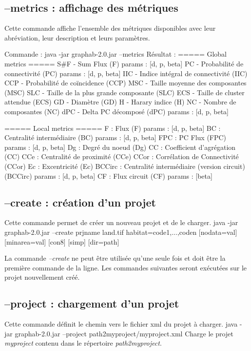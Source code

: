 \documentclass[a4paper,10pt]{report}
\newenvironment{cmd}
{\quote\Verbatim}
{\endVerbatim\endquote}
\begin{document}
\subsection{--metrics : affichage des métriques}
Cette commande affiche l'ensemble des métriques disponibles avec leur abréviation, leur description et leurs paramètres.

Commande :
\begin{cmd}
java -jar graphab-2.0.jar --metrics
\end{cmd}
Résultat :
\begin{cmd}
===== Global metrics =====
S#F - Sum Flux (F)
	params : [d, p, beta]
PC - Probabilité de connectivité (PC)
	params : [d, p, beta]
IIC - Indice intégral de connectivité (IIC)
CCP - Probabilité de coïncidence (CCP)
MSC - Taille moyenne des composantes (MSC)
SLC - Taille de la plus grande composante (SLC)
ECS - Taille de cluster attendue (ECS)
GD - Diamètre (GD)
H - Harary indice (H)
NC - Nombre de composantes (NC)
dPC - Delta PC décomposé (dPC)
	params : [d, p, beta]

===== Local metrics =====
F : Flux (F)
	params : [d, p, beta]
BC : Centralité intermédiaire (BC)
	params : [d, p, beta]
FPC : PC Flux (FPC)
	params : [d, p, beta]
Dg : Degré du noeud (Dg)
CC : Coefficient d'agrégation (CC)
CCe : Centralité de proximité (CCe)
CCor : Corrélation de Connectivité (CCor)
Ec : Excentricité (Ec)
BCCirc : Centralité intermédiaire (version circuit) (BCCirc)
	params : [d, p, beta]
CF : Flux circuit (CF)
	params : [beta]

\end{cmd}

\subsection{--create : création d'un projet}
Cette commande permet de créer un nouveau projet et de le charger.
\begin{cmd}
java -jar graphab-2.0.jar --create prjname land.tif habitat=code1,...,coden [nodata=val]
	[minarea=val] [con8] [simp] [dir=path]
\end{cmd}

La commande \textit{--create} ne peut être utilisée qu'une seule fois et doit être la première commande de la ligne.
Les commandes suivantes seront exécutées sur le projet nouvellement créé.

\subsection{--project : chargement d'un projet}
Cette commande définit le chemin vers le fichier xml du projet à charger.
\begin{cmd}
java -jar graphab-2.0.jar --project path2myproject/myproject.xml
\end{cmd}
Charge le projet \textit{myproject} contenu dans le répertoire \textit{path2myproject}.
\end{document}
